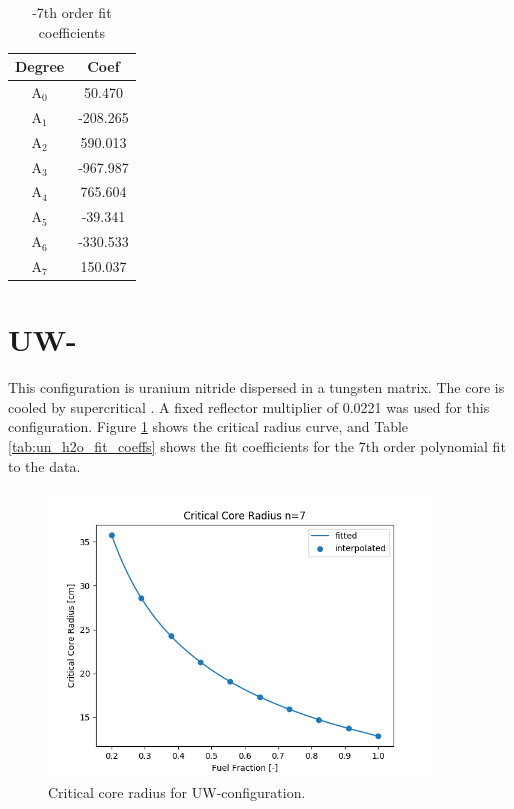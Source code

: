 \begin{table}[h]
  \centering
  \caption{\uox-\water 7th order fit coefficients}
  \begin{tabular}{cc}
    \toprule
     Degree & Coef\\ 
    \midrule                                  
    A$_0$  &  50.470\\
    A$_1$  &  -208.265\\
    A$_2$  &  590.013\\
    A$_3$  &  -967.987\\
    A$_4$  &  765.604\\
    A$_5$  &  -39.341\\
    A$_6$  &  -330.533\\
    A$_7$  &  150.037\\
  \end{tabular}
  \label{tab:uo2_h2o_fit_coeffs}
\end{table}


\newpage
\section{UW-\water}
This configuration is uranium nitride dispersed in a tungsten matrix. The core
is cooled by supercritical \water. A fixed reflector multiplier of 0.0221 was
used for this configuration. Figure \ref{fig:core_r_un_h2o} shows the critical
radius curve, and Table \ref{tab:un_h2o_fit_coeffs} shows the fit coefficients
for the 7th order polynomial fit to the data.

\begin{figure}[h]
    \centering
    \includegraphics[width=4in]{../images/core_r_un_h2o.png}
\caption{Critical core radius for UW-\water configuration.}
\label{fig:core_r_un_h2o}
\end{figure}



